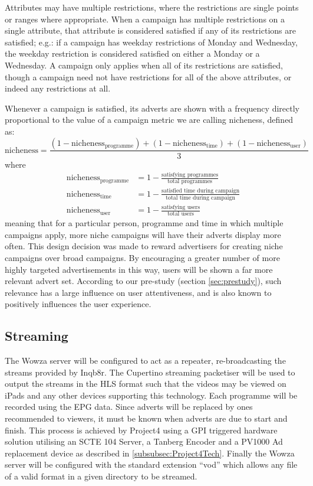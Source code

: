 Attributes may have multiple restrictions, where the restrictions are single points or ranges where appropriate. When a campaign has multiple restrictions on a single attribute, that attribute is considered satisfied if any of its restrictions are satisfied; e.g.: if a campaign has weekday restrictions of Monday and Wednesday, the weekday restriction is considered satisfied on either a Monday or a Wednesday. A campaign only applies when all of its restrictions are satisfied, though a campaign need not have restrictions for all of the above attributes, or indeed any restrictions at all.

Whenever a campaign is satisfied, its adverts are shown with a frequency directly proportional to the value of a campaign metric we are calling nicheness, defined as:
$$
	\text{nicheness} = \frac{(1-\text{nicheness}_\text{programme}) + (1-\text{nicheness}_\text{time}) + (1-\text{nicheness}_\text{user})}{3}
$$
where
\begin{align*}
	\text{nicheness}_\text{programme} &= 1 - \frac{\text{satisfying programmes}}{\text{total programmes}} \\
	\text{nicheness}_\text{time} &= 1 - \frac{\text{satisfied time during campaign}}{\text{total time during campaign}} \\
	\text{nicheness}_\text{user} &= 1 - \frac{\text{satisfying users}}{\text{total users}}
\end{align*}
meaning that for a particular person, programme and time in which multiple campaigns apply, more niche campaigns will have their adverts display more often. This design decision was made to reward advertisers for creating niche campaigns over broad campaigns. By encouraging a greater number of more highly targeted advertisements in this way, users will be shown a far more relevant advert set.
According to our pre-study (section \ref{sec:prestudy}), such relevance has a large influence on user attentiveness, and is also known to positively influences the user experience\citep{yahoo-intrusive-advertising}.

\subsection{Streaming}
The Wowza server will be configured to act as a repeater, re-broadcasting the streams provided by Inqb8r. The Cupertino streaming packetiser will be used to output the streams in the HLS format such that the videos may be viewed on iPads and any other devices supporting this technology. Each programme will be recorded using the EPG data. Since adverts will be replaced by ones recommended to viewers, it must be known when adverts are due to start and finish. This process is achieved by Project4 using a GPI\citep{SCTE104} triggered hardware solution utilising an SCTE 104 Server, a Tanberg Encoder and a PV1000 Ad replacement device as described in \ref{subsubsec:Project4Tech}. Finally the Wowza server will be configured with the standard extension ``vod'' which allows any file of a valid format in a given directory to be streamed.

